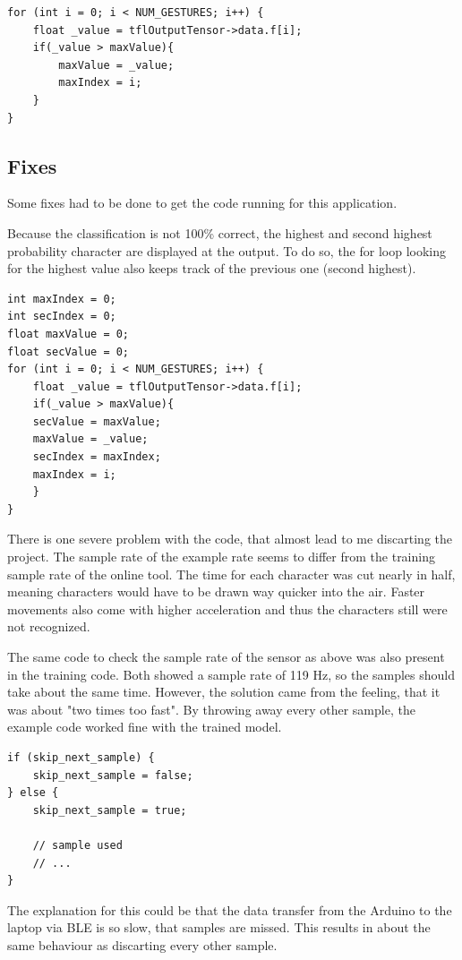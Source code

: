 \documentclass[a4paper,titlepage]{article}
\begin{document}
\begin{lstlisting}
for (int i = 0; i < NUM_GESTURES; i++) {
    float _value = tflOutputTensor->data.f[i];
    if(_value > maxValue){
        maxValue = _value;
        maxIndex = i;
    }
}
\end{lstlisting}

\subsection{Fixes}

Some fixes had to be done to get the code running for this application.

Because the classification is not 100\% correct, the highest and second highest probability character are displayed at the output.
To do so, the for loop looking for the highest value also keeps track of the previous one (second highest).

\begin{lstlisting}
int maxIndex = 0;
int secIndex = 0;
float maxValue = 0;
float secValue = 0;
for (int i = 0; i < NUM_GESTURES; i++) {
    float _value = tflOutputTensor->data.f[i];
    if(_value > maxValue){
    secValue = maxValue;
    maxValue = _value;
    secIndex = maxIndex;
    maxIndex = i;
    }
}
\end{lstlisting}

There is one severe problem with the code, that almost lead to me discarting the project.
The sample rate of the example rate seems to differ from the training sample rate of the online tool.
The time for each character was cut nearly in half, meaning characters would have to be drawn way quicker into the air.
Faster movements also come with higher acceleration and thus the characters still were not recognized.

The same code to check the sample rate of the sensor as above was also present in the training code.
Both showed a sample rate of 119 Hz, so the samples should take about the same time.
However, the solution came from the feeling, that it was about "two times too fast".
By throwing away every other sample, the example code worked fine with the trained model.

\begin{lstlisting}
if (skip_next_sample) {
    skip_next_sample = false;
} else {
    skip_next_sample = true;

    // sample used
    // ...
}
\end{lstlisting}

The explanation for this could be that the data transfer from the Arduino to the laptop via BLE is so slow, that samples are missed.
This results in about the same behaviour as discarting every other sample.
\end{document}
